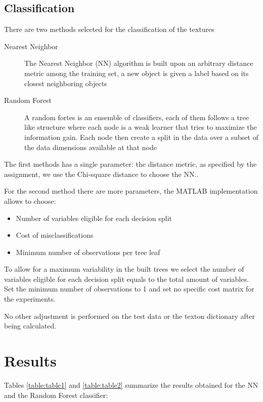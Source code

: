 \documentclass[10pt,twocolumn,letterpaper]{article}
\begin{document}
\subsection{Classification}
There are two methods selected for the classification of the textures

\begin{description}

\item[Nearest Neighbor] The  Nearest Neighbor (NN) algorithm is built upon an arbitrary distance metric among the training set, a new object is given a label based on its closest neighboring objects \cite{Gorunescu2011}
\item[Random Forest] A random fortes is an ensemble of classifiers, each of them follows a tree like structure where each node is a weak learner that tries to maximize the information gain. Each node then create a split in the data over a subset of the data dimensions available at that node\cite{Liaw2002}

\end{description}

The first methods has a single parameter: the distance metric, as specified by the assignment, we use the Chi-square distance to choose the NN..

For the second method there are more parameters, the MATLAB implementation allows to choose:

\begin{itemize}
	\item Number of variables eligible for each decision split
	\item Cost of misclassifications
	\item Minimum number of observations per tree leaf
\end{itemize}

To allow for a maximum variability in the built trees we select the number of variables eligible for each decision split equals to the total amount of variables. Set the minimum number of observations to 1 and set no specific cost matrix for the experiments.

No other adjustment is performed on the test data or the texton dictionary after being calculated.

\section{Results}
Tables \ref{table:table1} and \ref{table:table2}  summarize the results obtained for the NN and the Random Forest classifier:
\end{document}
